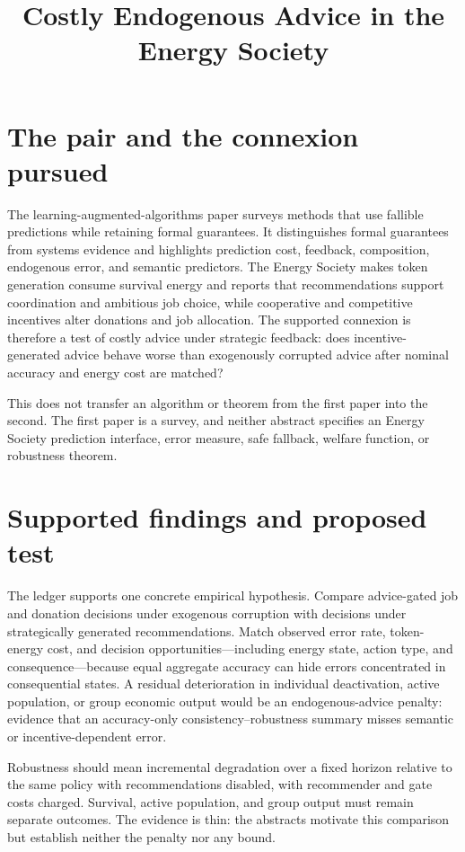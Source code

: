 \documentclass{article}
\title{Costly Endogenous Advice in the Energy Society}
\begin{document}
\maketitle

\section{The pair and the connexion pursued}

The learning-augmented-algorithms paper surveys methods that use fallible predictions while retaining formal guarantees.  It distinguishes formal guarantees from systems evidence and highlights prediction cost, feedback, composition, endogenous error, and semantic predictors.  The Energy Society makes token generation consume survival energy and reports that recommendations support coordination and ambitious job choice, while cooperative and competitive incentives alter donations and job allocation.  The supported connexion is therefore a test of costly advice under strategic feedback: does incentive-generated advice behave worse than exogenously corrupted advice after nominal accuracy and energy cost are matched? 

This does not transfer an algorithm or theorem from the first paper into the second.  The first paper is a survey, and neither abstract specifies an Energy Society prediction interface, error measure, safe fallback, welfare function, or robustness theorem. 

\section{Supported findings and proposed test}

The ledger supports one concrete empirical hypothesis.  Compare advice-gated job and donation decisions under exogenous corruption with decisions under strategically generated recommendations.  Match observed error rate, token-energy cost, and decision opportunities---including energy state, action type, and consequence---because equal aggregate accuracy can hide errors concentrated in consequential states.  A residual deterioration in individual deactivation, active population, or group economic output would be an endogenous-advice penalty: evidence that an accuracy-only consistency--robustness summary misses semantic or incentive-dependent error. 

Robustness should mean incremental degradation over a fixed horizon relative to the same policy with recommendations disabled, with recommender and gate costs charged.  Survival, active population, and group output must remain separate outcomes.  The evidence is thin: the abstracts motivate this comparison but establish neither the penalty nor any bound. 
\end{document}

